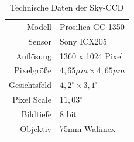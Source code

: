 \begin{table}[htbp]
\centering
\begin{tabular}{r|l}
\toprule
Modell & Prosilica GC 1350\\
Sensor & Sony ICX205\\
Auflösung & 1360 x 1024 Pixel \\
Pixelgröße & $4,65\unit{\mu m}\times 4,65\unit{\mu m}$\\
Gesichtsfeld & $4,2^{\circ} \times 3,1^{\circ} $\\
Pixel Scale & $11,03^{\circ}$\\
Bildtiefe & 8 bit\\
Objektiv & 75mm Walimex\\
\bottomrule
\end{tabular}
\caption{Technische Daten der Sky-CCD}
\label{tab:SkyCCD}
\end{table}



